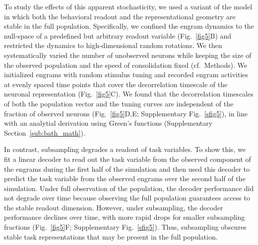 To study the effects of this apparent stochasticity, we used a variant of the model in which both the behavioral readout and the representational geometry are stable in the full population. Specifically, we confined the engram dynamics to the null-space of a predefined but arbitrary readout variable (Fig.~\ref{fig5}B) and restricted the dynamics to high-dimensional random rotations. We then systematically varied the number of unobserved neurons while keeping the size of the observed population and the speed of consolidation fixed (cf.~Methods). We initialized engrams with random stimulus tuning and recorded engram activities at evenly spaced time points that cover the decorrelation timescale of the neuronal representation (Fig.~\ref{fig5}C). We found that the decorrelation timescales of both the population vector and the tuning curves are independent of the fraction of observed neurons (Fig.~\ref{fig5}D,E; Supplementary Fig.~\ref{sfig5}), in line with an analytial derivation using Green's functions  (Supplementary Section~\ref{sub:bath_math}). 

In contrast, subsampling degrades a readout of task variables. To show this, we fit a linear decoder to read out the task variable from the observed component of the engrams during the first half of the simulation and then used this decoder to predict the task variable from the observed engrams over the second half of the simulation. Under full observation of the population, the decoder performance did not degrade over time because observing the full population guarantees access to the stable readout dimension. However, under subsampling, the decoder performance declines over time, with more rapid drops for smaller subsampling fractions (Fig.~\ref{fig5}F; Supplementary Fig.~\ref{sfig5}). Thus, subsampling obscures stable task representations that may be present in the full population.

